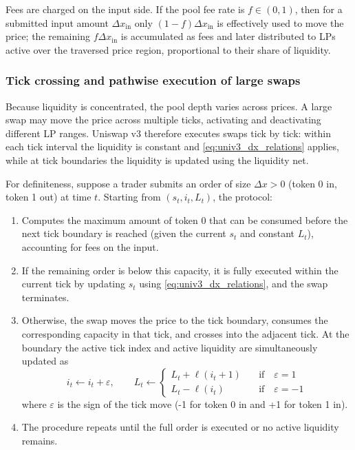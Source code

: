 \documentclass[11pt]{article}
\begin{document}
Fees are charged on the input side. If the pool fee rate is $f \in (0,1)$, then for a submitted input amount $\Delta x_{\mathrm{in}}$ only $(1-f)\Delta x_{\mathrm{in}}$ is effectively used to move the price; the remaining $f\Delta x_{\mathrm{in}}$ is accumulated as fees and later distributed to LPs active over the traversed price region, proportional to their share of liquidity.

\subsubsection{Tick crossing and pathwise execution of large swaps}

Because liquidity is concentrated, the pool depth varies across prices. A large swap may move the price across multiple ticks, activating and deactivating different LP ranges. Uniswap v3 therefore executes swaps tick by tick:
within each tick interval the liquidity is constant and \eqref{eq:univ3_dx_relations} applies, while at tick boundaries the liquidity is updated using the liquidity net.

For definiteness, suppose a trader submits an order of size $\Delta x>0$ (token 0 in, token 1 out) at time $t$.
Starting from $(s_t, i_t, L_t)$, the protocol:
\begin{enumerate}[leftmargin=*]
  \item Computes the maximum amount of token 0 that can be consumed before the next tick boundary is reached (given the current $s_t$ and constant $L_t$), accounting for fees on the input.
  \item If the remaining order is below this capacity, it is fully executed within the current tick by updating $s_t$ using \eqref{eq:univ3_dx_relations}, and the swap terminates.
  \item Otherwise, the swap moves the price to the tick boundary, consumes the corresponding capacity in that tick, and crosses into the adjacent tick. At the boundary the active tick index and active liquidity are simultaneously updated as
  \begin{equation}
    i_t \leftarrow i_t + \varepsilon, \qquad
    L_t \leftarrow \begin{cases}L_t +  \ell(i_t+1) \quad &\text{if} \quad  \varepsilon=1 \\
                                L_t -  \ell(i_t) \quad &\text{if} \quad  \varepsilon=-1\end{cases}
  \end{equation}
  where $\varepsilon$ is the sign of the tick move (-1 for token 0 in and +1 for token 1 in).
  \item The procedure repeats until the full order is executed or no active liquidity remains.
\end{enumerate}
\end{document}
